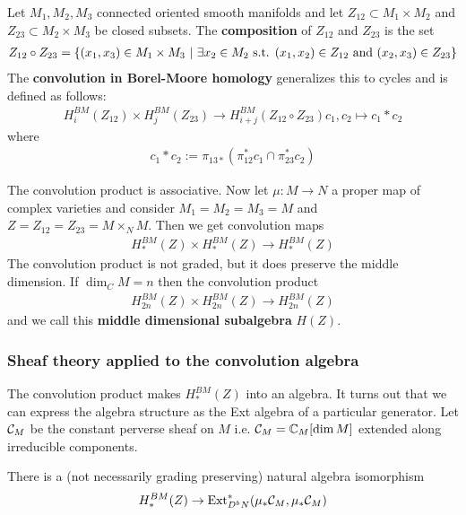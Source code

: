 \documentclass[12pt]{article}
\begin{document}
\begin{definition}
    Let $M_1,M_2,M_3$ connected oriented smooth manifolds and let $Z_{12}\subset M_1\times M_2$
    and $Z_{23}\subset M_2\times M_3$ be closed subsets. The \textbf{composition} of
    $Z_{12}$ and $Z_{23}$ is the set \begin{align*}
        Z_{12}\circ Z_{23} = \{(x_1,x_3)\in M_1\times M_3 \ \vert \  \exists x_2\in M_2 \text{ s.t. } (x_1,x_2)\in Z_{12} \text{ and } (x_2,x_3)\in Z_{23}\}
    \end{align*}
    The \textbf{convolution in Borel-Moore homology} generalizes 
    this to cycles and is defined as follows:
    \begin{align*}
        H^{BM}_i(Z_{12}) \times H^{BM}_j(Z_{23}) \to H^{BM}_{i+j}(Z_{12}\circ Z_{23})
        c_1,c_2 \mapsto c_1 * c_2
    \end{align*} where 
    \begin{align*}
        c_1 * c_2 := \pi_{13*}(\pi_{12}^*c_1 \cap \pi_{23}^*c_2)
    \end{align*}
\end{definition}

The convolution product is associative. Now let $\mu:M\to N$ a proper map 
of complex varieties and consider $M_1 = M_2 = M_3 = M$ and $Z = Z_{12} = Z_{23} 
= M\times_N M$. Then we get convolution maps \begin{align*}
    H^{BM}_*(Z) \times H^{BM}_*(Z) \to H^{BM}_{*}(Z)
\end{align*} The convolution product is not graded, but it does preserve the 
middle dimension. If $\dim_C M = n$ then the convolution product
\begin{align*}
    H^{BM}_{2n}(Z) \times H^{BM}_{2n}(Z) \to H^{BM}_{2n}(Z)
\end{align*} and we call this \textbf{middle dimensional subalgebra} $H(Z)$.

\subsubsection{Sheaf theory applied to the convolution algebra}
The convolution product makes $H^{BM}_*(Z)$ into an algebra. 
It turns out that we can express the algebra structure as 
the Ext algebra of a particular generator. Let ${\mathcal{C}}_M$ be the constant 
perverse sheaf on $M$ i.e. ${\mathcal{C}}_M = \mathbb{C}_M[\dim M]$ extended along irreducible
components.

\begin{proposition}
    There is a (not necessarily grading preserving) natural algebra 
    isomorphism \begin{align*}
        H^{BM}_*(Z) \to \operatorname{Ext}^*_{D^bN}(\mu_*{\mathcal{C}}_M,\mu_*{\mathcal{C}}_M)
    \end{align*} 
\end{proposition}
\end{document}
